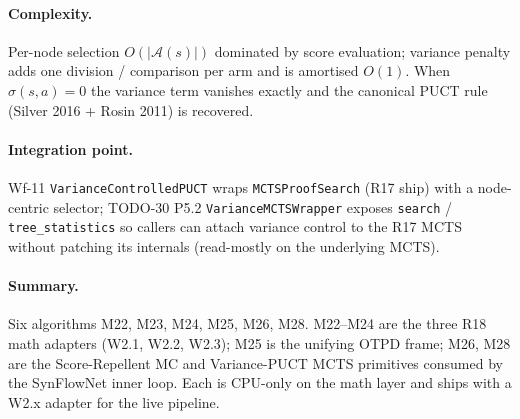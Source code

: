 \paragraph{Complexity.}
Per-node selection $O(|\mathcal{A}(s)|)$ dominated by score
evaluation; variance penalty adds one division / comparison per
arm and is amortised $O(1)$.  When $\sigma(s, a) = 0$ the
variance term vanishes exactly and the canonical PUCT rule
(Silver 2016 + Rosin 2011) is recovered.

\paragraph{Integration point.}
Wf-11 \texttt{VarianceControlledPUCT} wraps
\texttt{MCTSProofSearch} (R17 ship) with a node-centric selector;
TODO-30 P5.2 \texttt{VarianceMCTSWrapper} exposes
\texttt{search} / \texttt{tree\_statistics} so callers can attach
variance control to the R17 MCTS without patching its internals
(read-mostly on the underlying MCTS).

\paragraph{Summary.}
Six algorithms M22, M23, M24, M25, M26, M28.  M22--M24 are the
three R18 math adapters (W2.1, W2.2, W2.3); M25 is the unifying
OTPD frame; M26, M28 are the Score-Repellent MC and Variance-PUCT
MCTS primitives consumed by the SynFlowNet inner loop.  Each is
CPU-only on the math layer and ships with a W2.x adapter for the
live pipeline.

\endinput